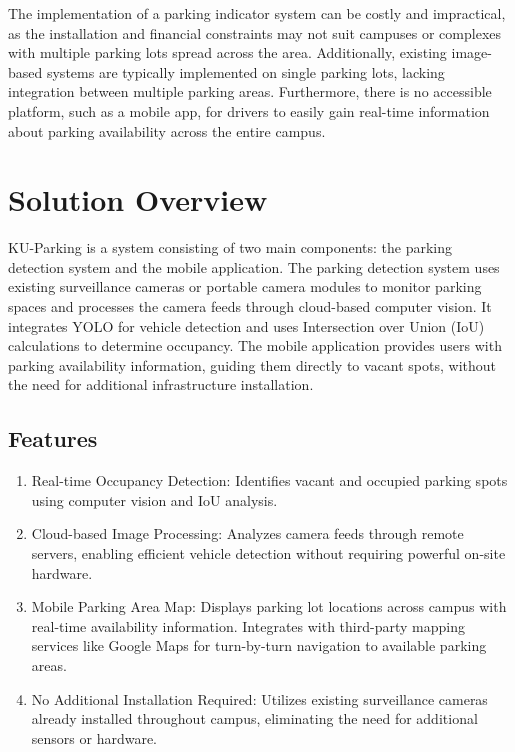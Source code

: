 The implementation of a parking indicator system can be costly and impractical, as the installation and financial constraints may not suit campuses or complexes with multiple parking lots spread across the area. Additionally, existing image-based systems are typically implemented on single parking lots, lacking integration between multiple parking areas. Furthermore, there is no accessible platform, such as a mobile app, for drivers to easily gain real-time information about parking availability across the entire campus.

\section{Solution Overview}
\label{section:solution-overview}

KU-Parking is a system consisting of two main components: the parking detection system and the mobile application. The parking detection system uses existing surveillance cameras or portable camera modules to monitor parking spaces and processes the camera feeds through cloud-based computer vision. It integrates YOLO for vehicle detection and uses Intersection over Union (IoU) calculations to determine occupancy. The mobile application provides users with parking availability information, guiding them directly to vacant spots, without the need for additional infrastructure installation.

\subsection{Features}
\label{subsection:features}

\begin{enumerate}[leftmargin=80pt]
    \item Real-time Occupancy Detection: Identifies vacant and occupied parking spots using computer vision and IoU analysis.
    
    \item Cloud-based Image Processing: Analyzes camera feeds through remote servers, enabling efficient vehicle detection without requiring powerful on-site hardware.
    
    \item Mobile Parking Area Map: Displays parking lot locations across campus with real-time availability information. Integrates with third-party mapping services like Google Maps for turn-by-turn navigation to available parking areas.
    
    \item No Additional Installation Required: Utilizes existing surveillance cameras already installed throughout campus, eliminating the need for additional sensors or hardware.
\end{enumerate}

